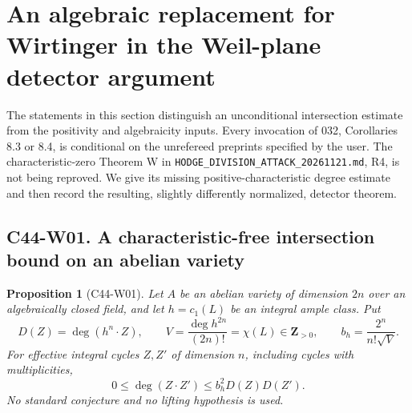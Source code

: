 \documentclass[11pt]{article}
\newtheorem{proposition}[theorem]{Proposition}
\theoremstyle{remark}\newtheorem{remark}[theorem]{Remark}
\begin{document}
\section{An algebraic replacement for Wirtinger in the Weil-plane detector argument}

The statements in this section distinguish an unconditional intersection
estimate from the positivity and algebraicity inputs.  Every invocation of
032, Corollaries 8.3 or 8.4, is conditional on the unrefereed preprints
specified by the user.  The characteristic-zero Theorem W in
\texttt{HODGE\_DIVISION\_ATTACK\_20261121.md}, R4, is not being reproved.
We give its missing positive-characteristic degree estimate and then record
the resulting, slightly differently normalized, detector theorem.

\subsection*{C44-W01. A characteristic-free intersection bound on an abelian variety}

\begin{proposition}[C44-W01]
Let $A$ be an abelian variety of dimension $2n$ over an algebraically
closed field, and let $h=c_1(L)$ be an integral ample class.  Put
\[
 D(Z)=\deg(h^n\cdot Z),\qquad
 V=\frac{\deg h^{2n}}{(2n)!}=\chi(L)\in\mathbf Z_{>0},\qquad
 b_h=\frac{2^n}{n!\sqrt V}.
\]
For effective integral cycles $Z,Z'$ of dimension $n$, including cycles
with multiplicities,
\begin{equation}\label{c44:algebraic-bezout}
 0\leq\deg(Z\cdot Z')\leq b_h^2D(Z)D(Z').
\end{equation}
No standard conjecture and no lifting hypothesis is used.
\end{proposition}
\end{document}
